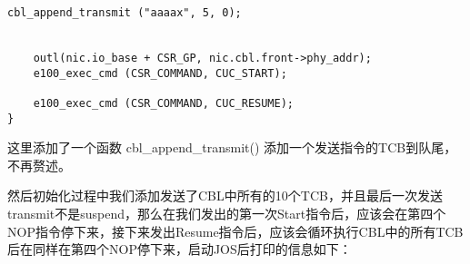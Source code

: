 \documentclass{article}
\newcommand{\funcname}[1]{{\ttfamily \small #1}}
\begin{document}
\begin{CJK*}{UTF8}{gkai}
\begin{lstlisting}[style=ccode, title={\scriptsize \ttfamily \bfseries kern/e100.c}]
    cbl_append_transmit ("aaaax", 5, 0);


    outl(nic.io_base + CSR_GP, nic.cbl.front->phy_addr);
    e100_exec_cmd (CSR_COMMAND, CUC_START); 

    e100_exec_cmd (CSR_COMMAND, CUC_RESUME); 
}
\end{lstlisting}

这里添加了一个函数 \funcname{cbl\_append\_transmit()} 添加一个发送指令的TCB到队尾，不再赘述。

然后初始化过程中我们添加发送了CBL中所有的10个TCB，并且最后一次发送transmit不是suspend，那么在我们发出的第一次Start指令后，应该会在第四个NOP指令停下来，接下来发出Resume指令后，应该会循环执行CBL中的所有TCB后在同样在第四个NOP停下来，启动JOS后打印的信息如下：

\vspace{1em}


\end{CJK*}
\end{document}
